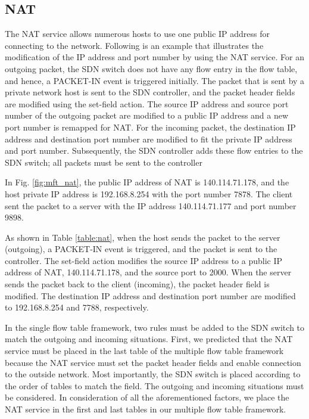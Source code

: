 \subsection{NAT}
The NAT service allows numerous hosts to use one public IP address for connecting to the network. Following is an example that illustrates the modification of the IP address and port number by using the NAT service. For an outgoing packet, the SDN switch does not have any flow entry in the flow table, and hence, a PACKET-IN event is triggered initially. The packet that is sent by a private network host is sent to the SDN controller, and the packet header fields are modified using the set-field action. The source IP address and source port number of the outgoing packet are modified to a public IP address and a new port number is remapped for NAT. For the incoming packet, the destination IP address and destination port number are modified to fit the private IP address and port number. Subsequently, the SDN controller adds these flow entries to the SDN switch; all packets must be sent to the controller

In Fig. \ref{fig:mft_nat}, the public IP address of NAT is 140.114.71.178, and the host private IP address is 192.168.8.254 with the port number 7878. The client sent the packet to a server with the IP address 140.114.71.177 and port number 9898.

As shown in Table \ref{table:nat}, when the host sends the packet to the server (outgoing), a PACKET-IN event is triggered, and the packet is sent to the controller. The set-field action modifies the source IP address to a public IP address of NAT, 140.114.71.178, and the source port to 2000. When the server sends the packet back to the client (incoming), the packet header field is modified. The destination IP address and destination port number are modified to 192.168.8.254 and 7788, respectively.

In the single flow table framework, two rules must be added to the SDN switch to match the outgoing and incoming situations. First, we predicted that the NAT service must be placed in the last table of the multiple flow table framework because the NAT service must set the packet header fields and enable connection to the outside network. Most importantly, the SDN switch is placed according to the order of tables to match the field. The outgoing and incoming situations must be considered. In consideration of all the aforementioned factors, we place the NAT service in the first and last tables in our multiple flow table framework.

